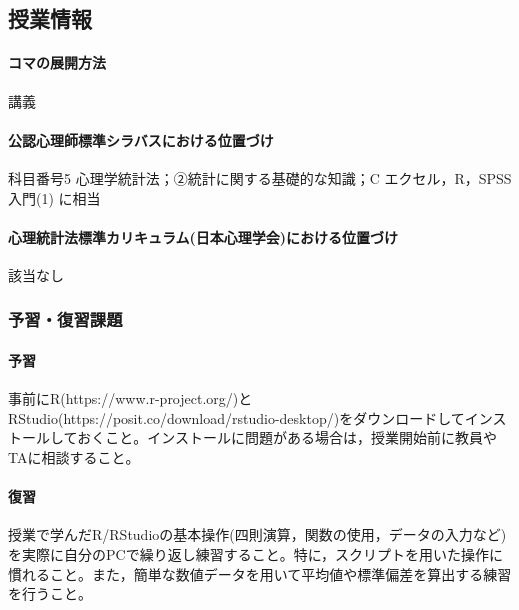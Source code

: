\subsection{授業情報}
\paragraph{コマの展開方法}
講義
\paragraph{公認心理師標準シラバスにおける位置づけ}
科目番号5 心理学統計法；②統計に関する基礎的な知識；C エクセル，R，SPSS入門(1) に相当
\paragraph{心理統計法標準カリキュラム(日本心理学会)における位置づけ}
該当なし
\subsubsection{予習・復習課題}
\paragraph{予習}
事前にR(https://www.r-project.org/)とRStudio(https://posit.co/download/rstudio-desktop/)をダウンロードしてインストールしておくこと。インストールに問題がある場合は，授業開始前に教員やTAに相談すること。

\paragraph{復習}
授業で学んだR/RStudioの基本操作(四則演算，関数の使用，データの入力など)を実際に自分のPCで繰り返し練習すること。特に，スクリプトを用いた操作に慣れること。また，簡単な数値データを用いて平均値や標準偏差を算出する練習を行うこと。